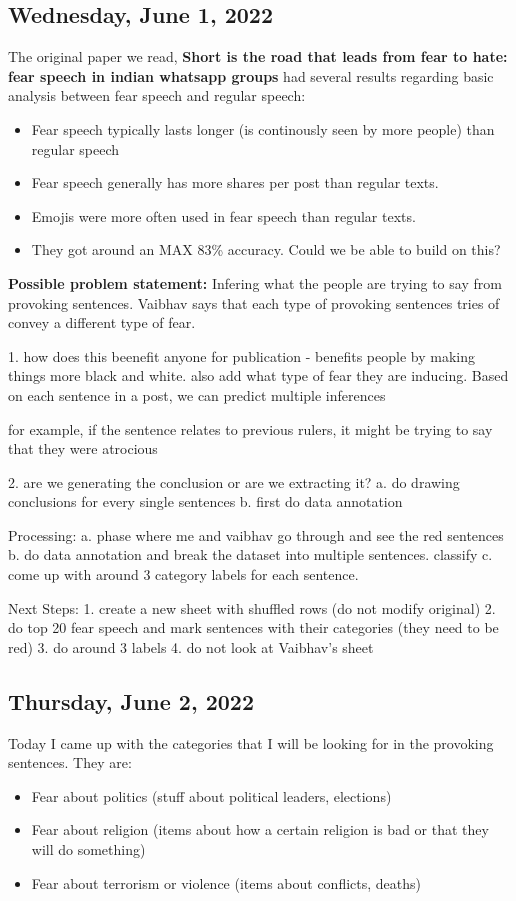 \documentclass[11pt,letterpaper]{article}
\begin{document}
\subsection{Wednesday, June 1, 2022}
The original paper we read, \textbf{Short is the road that leads from fear to hate: fear speech in indian whatsapp groups} had several results regarding basic analysis between fear speech and regular speech: 
\begin{itemize}
    \item Fear speech typically lasts longer (is continously seen by more people) than regular speech
    \item Fear speech generally has more shares per post than regular texts.
    \item Emojis were more often used in fear speech than regular texts.
    \item They got around an MAX 83\% accuracy. Could we be able to build on this?
\end{itemize}

\textbf{Possible problem statement:} Infering what the people are trying to say from provoking sentences. Vaibhav says that each type of provoking sentences tries of convey a different type of fear.




1. how does this beenefit anyone for publication - benefits people by making things more black and white. also add what type of fear they are inducing. Based on each sentence in a post, we can predict multiple inferences 

for example, if the sentence relates to previous rulers, it might be trying to say that they were atrocious

2. are we generating the conclusion or are we extracting it? 
    a. do drawing conclusions for every single sentences
    b. first do data annotation
    
Processing:
a. phase where me and vaibhav go through and see the red sentences
b. do data annotation and break the dataset into multiple sentences. classify 
c. come up with around 3 category labels for each sentence.

Next Steps:
1. create a new sheet with shuffled rows (do not modify original)
2. do top 20 fear speech and mark sentences with their categories (they need to be red)
3. do around 3 labels
4. do not look at Vaibhav's sheet

\subsection{Thursday, June 2, 2022}
Today I came up with the categories that I will be looking for in the provoking sentences. They are:
\begin{itemize}
    \item Fear about politics (stuff about political leaders, elections)
    \item Fear about religion (items about how a certain religion is bad or that they will do something)
    \item Fear about terrorism or violence  (items about conflicts, deaths)
\end{itemize}
\end{document}
